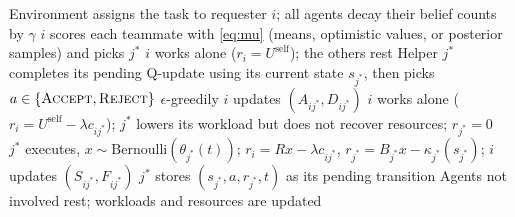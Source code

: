 \documentclass{article}
\newcommand{\Uself}{U^{\mathrm{self}}}
\begin{document}
\begin{algorithm}[t]
\caption{One interaction round (E5--E7). Every agent runs both the requester and the helper logic.}\label{alg:round}
\small
\begin{algorithmic}[1]
\State Environment assigns the task to requester $i$; all agents decay their belief counts by $\gamma$
\State $i$ scores each teammate with \eqref{eq:mu} (means, optimistic values, or posterior samples) and picks $j^*$
\If{$\hat\mu_{ij^*}\le \Uself$} $i$ works alone ($r_i=\Uself$); the others rest
\Else
  \State Helper $j^*$ completes its pending Q-update using its current state $s_{j^*}$, then picks $a\in\{\textsc{Accept},\textsc{Reject}\}$ $\epsilon$-greedily
  \State $i$ updates $(A_{ij^*},D_{ij^*})$
   $i$ works alone ($r_i=\Uself-\lambda c_{ij^*}$); $j^*$ lowers its workload but does not recover resources; $r_{j^*}=0$
  \Else\ $j^*$ executes, $x\sim\mathrm{Bernoulli}(\theta_{j^*}(t))$; $r_i=Rx-\lambda c_{ij^*}$, $r_{j^*}=B_{j^*}x-\kappa_{j^*}(s_{j^*})$; $i$ updates $(S_{ij^*},F_{ij^*})$
  \EndIf
  \State $j^*$ stores $(s_{j^*},a,r_{j^*},t)$ as its pending transition
\EndIf
\State Agents not involved rest; workloads and resources are updated
\end{algorithmic}
\end{algorithm}
\end{document}
